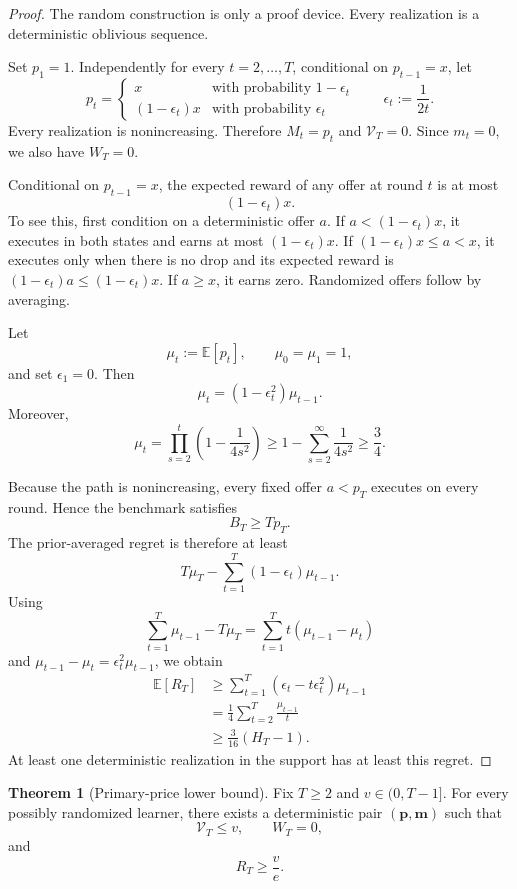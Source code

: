 \documentclass[11pt]{article}
\theoremstyle{definition}
\newtheorem{theorem}{Theorem}
\begin{document}
\begin{proof}
The random construction is only a proof device. Every realization is a
deterministic oblivious sequence.

Set $p_1=1$. Independently for every $t=2,\ldots,T$, conditional on
$p_{t-1}=x$, let
\[
    p_t=
    \begin{cases}
        x & \text{with probability }1-\epsilon_t\\
        (1-\epsilon_t)x & \text{with probability }\epsilon_t
    \end{cases}
    \qquad
    \epsilon_t:=\frac{1}{2t}.
\]
Every realization is nonincreasing. Therefore $M_t=p_t$ and
$\mathcal{V}_T=0$. Since $m_t=0$, we also have $W_T=0$.

Conditional on $p_{t-1}=x$, the expected reward of any offer at round
$t$ is at most
\[
    (1-\epsilon_t)x.
\]
To see this, first condition on a deterministic offer $a$. If
$a<(1-\epsilon_t)x$, it executes in both states and earns at most
$(1-\epsilon_t)x$. If $(1-\epsilon_t)x\le a<x$, it executes only when
there is no drop and its expected reward is
$(1-\epsilon_t)a\le(1-\epsilon_t)x$. If $a\ge x$, it earns zero.
Randomized offers follow by averaging.

Let
\[
    \mu_t:=\mathbb{E}[p_t],
    \qquad
    \mu_0=\mu_1=1,
\]
and set $\epsilon_1=0$. Then
\[
    \mu_t=(1-\epsilon_t^2)\mu_{t-1}.
\]
Moreover,
\[
    \mu_t
    =\prod_{s=2}^t\left(1-\frac{1}{4s^2}\right)
    \ge
    1-\sum_{s=2}^{\infty}\frac{1}{4s^2}
    \ge\frac{3}{4}.
\]

Because the path is nonincreasing, every fixed offer $a<p_T$ executes
on every round. Hence the benchmark satisfies
\[
    B_T\ge Tp_T.
\]
The prior-averaged regret is therefore at least
\[
    T\mu_T-\sum_{t=1}^T(1-\epsilon_t)\mu_{t-1}.
\]
Using
\[
    \sum_{t=1}^T\mu_{t-1}-T\mu_T
    =
    \sum_{t=1}^Tt(\mu_{t-1}-\mu_t)
\]
and $\mu_{t-1}-\mu_t=\epsilon_t^2\mu_{t-1}$, we obtain
\begin{align*}
    \mathbb{E}[R_T]
    &\ge
    \sum_{t=1}^T
    (\epsilon_t-t\epsilon_t^2)\mu_{t-1}\\
    &=
    \frac{1}{4}\sum_{t=2}^T\frac{\mu_{t-1}}{t}\\
    &\ge
    \frac{3}{16}(H_T-1).
\end{align*}
At least one deterministic realization in the support has at least this
regret.
\end{proof}

\begin{theorem}[Primary-price lower bound]
\label{thm:primary-price-lower-bound}
Fix $T\ge2$ and $v\in(0,T-1]$. For every possibly randomized learner,
there exists a deterministic pair
$(\boldsymbol{p},\boldsymbol{m})$ such that
\[
    \mathcal{V}_T\le v,
    \qquad
    W_T=0,
\]
and
\[
    R_T\ge\frac{v}{e}.
\]
\end{theorem}
\end{document}

